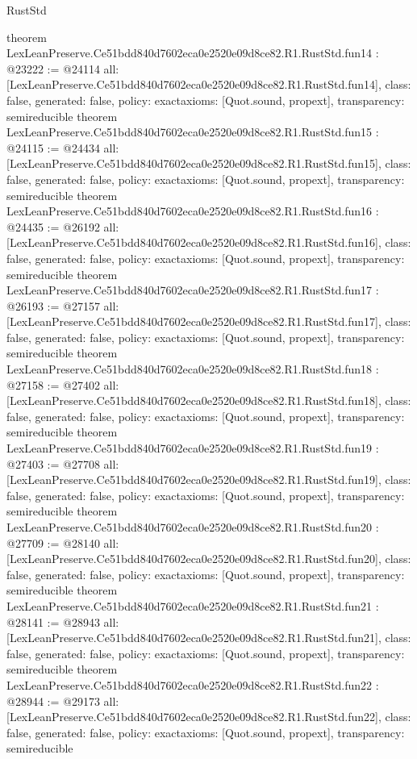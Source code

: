 \begin{lexlean}{RustStd}
\begin{coremodule}
{}
theorem LexLeanPreserve.Ce51bdd840d7602eca0e2520e09d8ce82.R1.RustStd.fun14 : @23222 := @24114 {
  all: [LexLeanPreserve.Ce51bdd840d7602eca0e2520e09d8ce82.R1.RustStd.fun14],
  class: false,
  generated: false,
  policy: exact{axioms: [Quot.sound, propext]},
  transparency: semireducible
}
theorem LexLeanPreserve.Ce51bdd840d7602eca0e2520e09d8ce82.R1.RustStd.fun15 : @24115 := @24434 {
  all: [LexLeanPreserve.Ce51bdd840d7602eca0e2520e09d8ce82.R1.RustStd.fun15],
  class: false,
  generated: false,
  policy: exact{axioms: [Quot.sound, propext]},
  transparency: semireducible
}
theorem LexLeanPreserve.Ce51bdd840d7602eca0e2520e09d8ce82.R1.RustStd.fun16 : @24435 := @26192 {
  all: [LexLeanPreserve.Ce51bdd840d7602eca0e2520e09d8ce82.R1.RustStd.fun16],
  class: false,
  generated: false,
  policy: exact{axioms: [Quot.sound, propext]},
  transparency: semireducible
}
theorem LexLeanPreserve.Ce51bdd840d7602eca0e2520e09d8ce82.R1.RustStd.fun17 : @26193 := @27157 {
  all: [LexLeanPreserve.Ce51bdd840d7602eca0e2520e09d8ce82.R1.RustStd.fun17],
  class: false,
  generated: false,
  policy: exact{axioms: [Quot.sound, propext]},
  transparency: semireducible
}
theorem LexLeanPreserve.Ce51bdd840d7602eca0e2520e09d8ce82.R1.RustStd.fun18 : @27158 := @27402 {
  all: [LexLeanPreserve.Ce51bdd840d7602eca0e2520e09d8ce82.R1.RustStd.fun18],
  class: false,
  generated: false,
  policy: exact{axioms: [Quot.sound, propext]},
  transparency: semireducible
}
theorem LexLeanPreserve.Ce51bdd840d7602eca0e2520e09d8ce82.R1.RustStd.fun19 : @27403 := @27708 {
  all: [LexLeanPreserve.Ce51bdd840d7602eca0e2520e09d8ce82.R1.RustStd.fun19],
  class: false,
  generated: false,
  policy: exact{axioms: [Quot.sound, propext]},
  transparency: semireducible
}
theorem LexLeanPreserve.Ce51bdd840d7602eca0e2520e09d8ce82.R1.RustStd.fun20 : @27709 := @28140 {
  all: [LexLeanPreserve.Ce51bdd840d7602eca0e2520e09d8ce82.R1.RustStd.fun20],
  class: false,
  generated: false,
  policy: exact{axioms: [Quot.sound, propext]},
  transparency: semireducible
}
theorem LexLeanPreserve.Ce51bdd840d7602eca0e2520e09d8ce82.R1.RustStd.fun21 : @28141 := @28943 {
  all: [LexLeanPreserve.Ce51bdd840d7602eca0e2520e09d8ce82.R1.RustStd.fun21],
  class: false,
  generated: false,
  policy: exact{axioms: [Quot.sound, propext]},
  transparency: semireducible
}
theorem LexLeanPreserve.Ce51bdd840d7602eca0e2520e09d8ce82.R1.RustStd.fun22 : @28944 := @29173 {
  all: [LexLeanPreserve.Ce51bdd840d7602eca0e2520e09d8ce82.R1.RustStd.fun22],
  class: false,
  generated: false,
  policy: exact{axioms: [Quot.sound, propext]},
  transparency: semireducible
}
\end{coremodule}
\end{lexlean}

